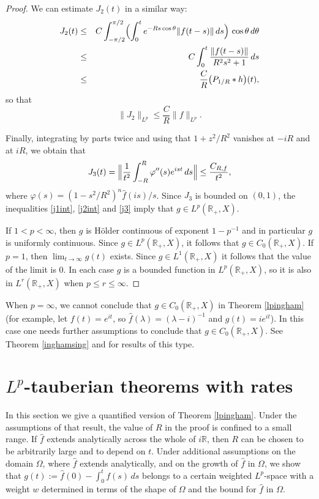 \documentclass[11pt]{amsart}
\theoremstyle{definition}
\theoremstyle{remark}
\numberwithin{equation}{section}
\begin{document}
\begin{proof}
We can estimate $J_2(t)$ in a similar way:
\begin{eqnarray} \label{j2est}
J_2(t) &\le&
C \int_{-\pi/2}^{\pi/2} \Bigl(\int_{0}^t e^{-Rs\cos\theta}\|f(t-s)\|\,ds\Bigr)\, \cos\theta\,d\theta
\\
& \le& C\int_{0}^t
\frac{\|f(t-s)\|}{R^2s^2+1} \,ds \nonumber
\\
&\le& \frac{C}{R}  \big(P_{1/R}* h\big)(t), \nonumber
\end{eqnarray}
so that
\begin{equation}\label{j2int}
\| J_2 \|_{L^p}  \le \frac{C}{R} \|f\|_{L^p}.
\end{equation}

Finally, integrating by parts twice and using that $1+z^2/R^2$ vanishes at $-iR$ and at $iR$, we obtain that
\begin{equation}\label{j3}
J_3(t) = \Bigl\| \frac{1}{t^2} 
\int_{-R}^R \varphi''(s) e^{ist} \, ds 
\Bigr\| \le  \frac{C_{R,f}}{t^2},
\end{equation}
where $\varphi(s) = (1-s^2/R^2)^n \widehat f(is)/s$.  Since $J_3$ is bounded on $(0,1)$, the inequalities \eqref{j1int}, \eqref{j2int} and \eqref{j3} imply that $g \in L^p(\mathbb R_+, X)$.

If $1<p<\infty$, then $g$ is H\"older continuous of exponent $1 - p^{-1}$ and in particular $g$ is uniformly continuous.  Since $g \in L^p({{\mathbb R}}_+,X)$, it follows that $g \in C_0({{\mathbb R}}_+,X)$.  If $p=1$, then $\lim_{t\to\infty} g(t)$ exists.  Since $g \in L^1({{\mathbb R}}_+,X)$ it follows that the value of the limit is $0$.  In each case $g$ is a bounded function in $L^p({{\mathbb R}}_+,X)$, so it is also in $L^r({{\mathbb R}}_+,X)$ when $p \le r \le \infty$.
\end{proof}

When $p=\infty$, we cannot conclude that $g \in C_0({{\mathbb R}}_+,X)$ in Theorem \ref{lpingham} (for example, let $f(t) = e^{it}$, so $\widehat f(\lambda) = (\lambda-i)^{-1}$ and $g(t) = ie^{it}$).  In this case one needs further assumptions to conclude that $g \in C_0({{\mathbb R}}_+,X)$.  See Theorem \ref{inghamsing} and \cite{ArBa88} for results of this type.

\section{$L^p$-tauberian theorems with rates}\label{se4}

In this section we give a quantified version of Theorem \ref{lpingham}.  Under the assumptions of that result, the value of $R$ in the proof is confined to a small range.  If $\widehat f$ extends analytically across the whole of $i{{\mathbb R}}$, then $R$ can be chosen to be arbitrarily large and to depend on $t$.  Under additional assumptions on the domain $\Omega$, where $\widehat f$ extends analytically, and on the growth of $\widehat f$ in $\Omega$, we show that $g(t):=\widehat f(0)-\int_{0}^t f(s)\, ds$ belongs to a certain weighted $L^p$-space with a weight $w$ determined in terms of the shape of $\Omega$ and the bound for $\widehat f$ in $\Omega$.
\end{document}
